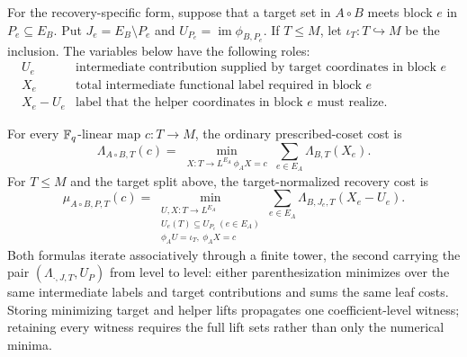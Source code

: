 For the recovery-specific form, suppose that a target set in $A\circ B$ meets
block $e$ in $P_e\subseteq E_B$.  Put $J_e=E_B\setminus P_e$ and
$U_{P_e}=\operatorname{im}\phi_{B,P_e}$.  If $T\leq M$, let
$\iota_T:T\hookrightarrow M$ be the inclusion.  The variables below have the
following roles:
\[
\begin{array}{c|l}
 U_e & \text{intermediate contribution supplied by target coordinates in block }e\\
 X_e & \text{total intermediate functional label required in block }e\\
 X_e-U_e & \text{label that the helper coordinates in block }e\text{ must realize.}
\end{array}
\]

\begin{theorem}
\label{prop:prescribed-coset-composition}
%
%
%
For every $\mathbb F_q$-linear map $c:T\to M$, the ordinary prescribed-coset cost is
\begin{equation}
 \Lambda_{A\circ B,T}(c)=
 \min_{\substack{X:T\to L^{E_A}\ \phi_AX=c}}
 \sum_{e\in E_A}\Lambda_{B,T}(X_e).
 \label{eq:coset-cost-composition}
\end{equation}
For $T\leq M$ and the target split above, the target-normalized recovery cost
is
\begin{equation}
 \mu_{A\circ B,P,T}(c)=
 \min_{\substack{U,X:T\to L^{E_A}\\
                  U_e(T)\subseteq U_{P_e}\ (e\in E_A)\\
                  \phi_AU=\iota_T,\ \phi_AX=c}}
 \sum_{e\in E_A}\Lambda_{B,J_e,T}(X_e-U_e).
 \label{eq:target-cost-composition}
\end{equation}
Both formulas iterate associatively through a finite tower, the second
carrying the pair $(\Lambda_{\cdot,J,T},U_P)$ from level to level: either
parenthesization minimizes over the same intermediate labels and target
contributions and sums the same leaf costs.  Storing minimizing target and
helper lifts propagates one coefficient-level witness; retaining every witness
requires the full lift sets rather than only the numerical minima.
\end{theorem}

